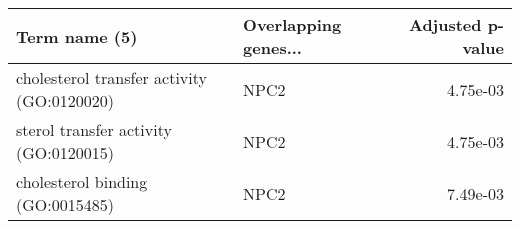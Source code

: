 \begin{tabular}{llr}
\toprule
                             Term name (5) & Overlapping genes... &  Adjusted p-value \\
\midrule
cholesterol transfer activity (GO:0120020) &                 NPC2 &          4.75e-03 \\
     sterol transfer activity (GO:0120015) &                 NPC2 &          4.75e-03 \\
          cholesterol binding (GO:0015485) &                 NPC2 &          7.49e-03 \\
\bottomrule
\end{tabular}
